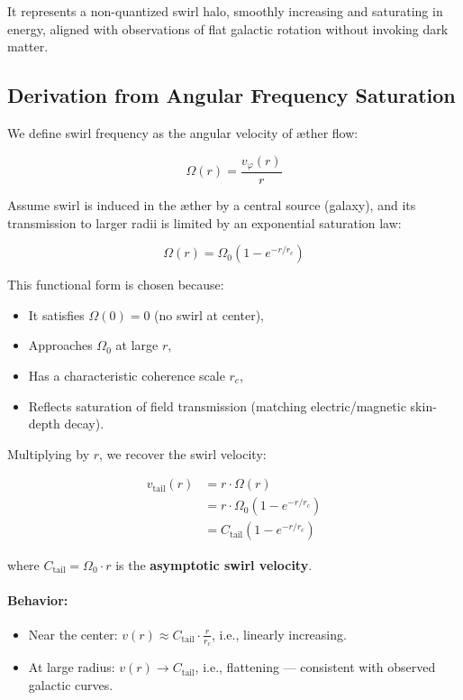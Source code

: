 \documentclass[12pt]{article}
\begin{document}
It represents a non-quantized swirl halo, smoothly increasing and saturating in energy, aligned with observations of flat galactic rotation without invoking dark matter.

\subsection{Derivation from Angular Frequency Saturation}

We define swirl frequency as the angular velocity of æther flow:

\begin{equation}
    \Omega(r) = \frac{v_\varphi(r)}{r}
    \label{eq:omega_definition}
\end{equation}

Assume swirl is induced in the æther by a central source (galaxy), and its transmission to larger radii is limited by an exponential saturation law:

\begin{equation}
    \Omega(r) = \Omega_0 \left( 1 - e^{-r/r_c} \right)
    \label{eq:omega_saturation}
\end{equation}

This functional form is chosen because:
\begin{itemize}
    \item It satisfies \( \Omega(0) = 0 \) (no swirl at center),
    \item Approaches \( \Omega_0 \) at large \( r \),
    \item Has a characteristic coherence scale \( r_c \),
    \item Reflects saturation of field transmission (matching electric/magnetic skin-depth decay).
\end{itemize}

Multiplying by \( r \), we recover the swirl velocity:

\begin{align}
    v_\text{tail}(r)
    &= r \cdot \Omega(r) \\
    &= r \cdot \Omega_0 \left( 1 - e^{-r/r_c} \right) \\
    &= C_{\text{tail}} \left( 1 - e^{-r/r_c} \right)
    \label{eq:tail_velocity}
\end{align}

where \( C_{\text{tail}} = \Omega_0 \cdot r \) is the \textbf{asymptotic swirl velocity}.

\paragraph{Behavior:}
\begin{itemize}
    \item Near the center: \( v(r) \approx C_{\text{tail}} \cdot \frac{r}{r_c} \), i.e., linearly increasing.
    \item At large radius: \( v(r) \to C_{\text{tail}} \), i.e., flattening — consistent with observed galactic curves.
\end{itemize}
\end{document}
